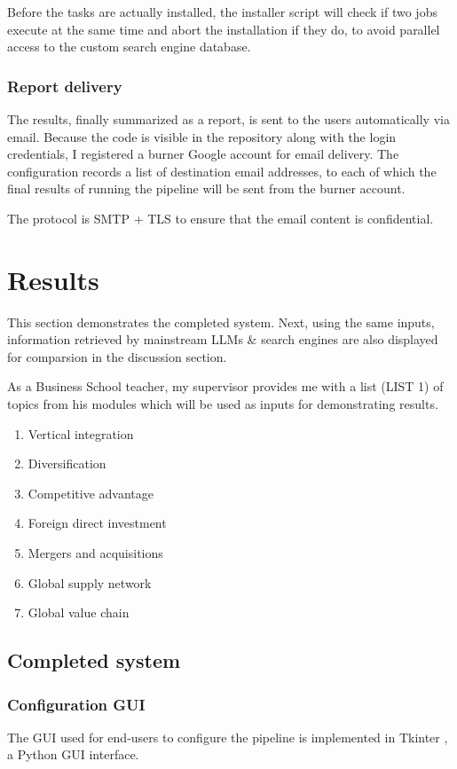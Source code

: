 \documentclass[final-report]{report-template}
\begin{document}
Before the tasks are actually installed, the installer script will check if two
jobs execute at the same time and abort the installation if they do, to avoid
parallel access to the custom search engine database.

\subsubsection{Report delivery} 
The results, finally summarized as a report, is sent to the users automatically
via email. Because the code is visible in the repository along with the login
credentials, I registered a burner Google account for email delivery. The
configuration records a list of destination email addresses, to each of which
the final results of running the pipeline will be sent from the burner account.

The protocol is SMTP + TLS to ensure that the email content is confidential.


\section{Results}
This section demonstrates the completed system.  Next, using the same inputs,
information retrieved by mainstream LLMs \& search engines are also displayed
for comparsion in the discussion section.

As a Business School teacher, my supervisor provides me with a list (LIST 1) of
topics from his modules which will be used as inputs for demonstrating results.
\begin{enumerate}
	\item Vertical integration
	\item Diversification 
	\item Competitive advantage
	\item Foreign direct investment
	\item Mergers and acquisitions
	\item Global supply network
	\item Global value chain
\end{enumerate}

\subsection{Completed system}
\subsubsection{Configuration GUI}
The GUI used for end-users to configure the pipeline is implemented in Tkinter
\cite{tkinter}, a Python GUI interface. 
\end{document}
